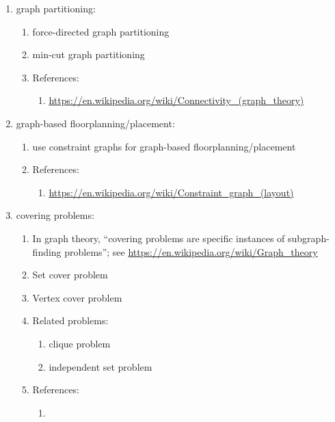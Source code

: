 \begin{enumerate}
\item graph partitioning: \vspace{-0.3cm}
	\begin{enumerate} \itemsep -2pt
	\item force-directed graph partitioning
	\item min-cut graph partitioning
	\item References: \vspace{-0.2cm}
		\begin{enumerate} \itemsep -2pt
		\item \url{https://en.wikipedia.org/wiki/Connectivity_(graph_theory)}
		\end{enumerate}
	\end{enumerate}
\item graph-based floorplanning/placement: \vspace{-0.3cm}
	\begin{enumerate} \itemsep -2pt
	\item use constraint graphs for graph-based floorplanning/placement
	\item References: \vspace{-0.2cm}
		\begin{enumerate} \itemsep -2pt
		\item \url{https://en.wikipedia.org/wiki/Constraint_graph_(layout)}
		\end{enumerate}
	\end{enumerate}
\item covering problems: \vspace{-0.3cm}
	\begin{enumerate} \itemsep -2pt
	\item In graph theory, ``covering problems are specific instances of subgraph-finding problems''; see \url{https://en.wikipedia.org/wiki/Graph_theory}
	\item Set cover problem
	\item Vertex cover problem
	\item Related problems: \vspace{-0.2cm}
		\begin{enumerate} \itemsep -2pt
		\item clique problem
		\item independent set problem
		\end{enumerate}
	\item References: \vspace{-0.2cm}
		\begin{enumerate} \itemsep -2pt
		\item 

\end{enumerate}
\end{enumerate}
\end{enumerate}
